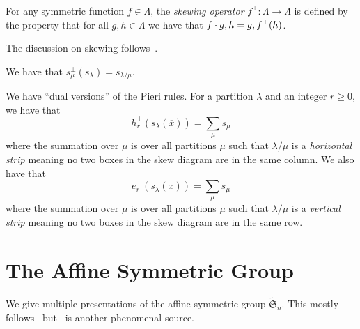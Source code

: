 \documentclass[letterpaper]{article}
\newcommand*\affS{\widetilde{\mathfrak{S}}}
\begin{document}
\begin{defn}
  For any symmetric function $f \in \Lambda$, the \emph{skewing operator} $f^\perp\colon \Lambda \to \Lambda$ is defined by the property that for all $g, h \in \Lambda$ we have that $\inner{f \cdot g, h} = \inner{g, f^\perp(h)}$.
\end{defn}

The discussion on skewing follows~\cite[Chapter 2]{GR26}.

\begin{ex}
  We have that $s_\mu^\perp(s_\lambda) = s_{\lambda / \mu}$.
\end{ex}

\begin{ex}
  We have ``dual versions'' of the Pieri rules.
  For a partition $\lambda$ and an integer $r \geq 0$, we have that
  \[
    h_r^\perp (s_\lambda(\overline{x})) = \sum_{\mu} s_\mu
  \]
  where the summation over $\mu$ is over all partitions $\mu$ such that $\lambda / \mu$ is a \emph{horizontal strip} meaning no two boxes in the skew diagram are in the same column. 
  We also have that
  \[
    e_r^\perp (s_\lambda(\overline{x})) = \sum_{\mu} s_\mu
  \]
  where the summation over $\mu$ is over all partitions $\mu$ such that $\lambda / \mu$ is a \emph{vertical strip} meaning no two boxes in the skew diagram are in the same row. 
\end{ex}

\clearpage

\section{The Affine Symmetric Group}

We give multiple presentations of the affine symmetric group $\affS_n$.
This mostly follows~\cite[Chapter 1, \S 2]{LLM+14} but~\cite[Chapter 8, \S 3]{BB05} is another phenomenal source.
\end{document}
